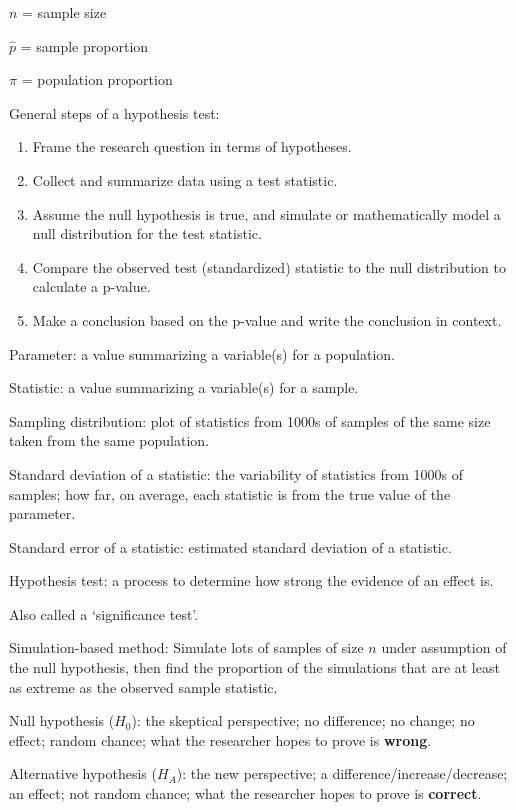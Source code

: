 \documentclass[
]{report}
\newcommand{\rgi}{\hspace{24pt}}  %
\begin{document}
\(n\) = sample size

\(\hat{p}\) = sample proportion

\(\pi\) = population proportion

General steps of a hypothesis test:

\begin{enumerate}
\def\labelenumi{\arabic{enumi}.}
\item
  Frame the research question in terms of hypotheses.
\item
  Collect and summarize data using a test statistic.
\item
  Assume the null hypothesis is true, and simulate or mathematically model a null distribution for the test statistic.
\item
  Compare the observed test (standardized) statistic to the null distribution to calculate a p-value.
\item
  Make a conclusion based on the p-value and write the conclusion in context.
\end{enumerate}

Parameter: a value summarizing a variable(s) for a population.

Statistic: a value summarizing a variable(s) for a sample.

Sampling distribution: plot of statistics from 1000s of samples of the same size taken from the same population.

Standard deviation of a statistic: the variability of statistics from 1000s of samples; how far, on average, each statistic is from the true value of the parameter.

Standard error of a statistic: estimated standard deviation of a statistic.

Hypothesis test: a process to determine how strong the evidence of an effect is.

\rgi Also called a `significance test'.

Simulation-based method: Simulate lots of samples of size \(n\) under assumption of the null hypothesis, then find the proportion of the simulations that are at least as extreme as the observed sample statistic.

Null hypothesis (\(H_0\)): the skeptical perspective; no difference; no change; no effect; random chance; what the researcher hopes to prove is \textbf{wrong}.

Alternative hypothesis (\(H_A\)): the new perspective; a difference/increase/decrease; an effect; not random chance; what the researcher hopes to prove is \textbf{correct}.
\end{document}
